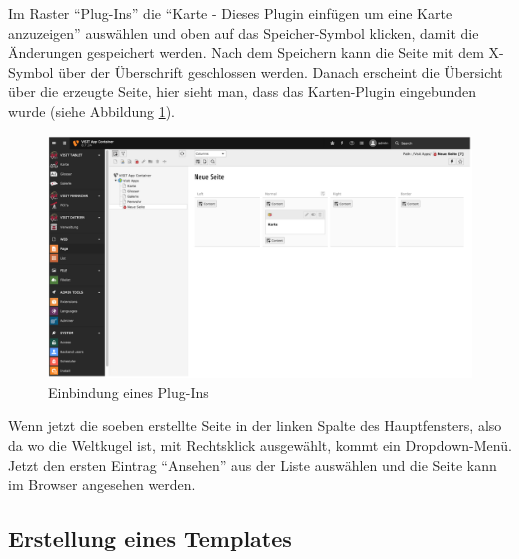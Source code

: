 Im Raster “Plug-Ins” die “Karte - Dieses Plugin einfügen um eine Karte anzuzeigen” auswählen und oben auf das Speicher-Symbol klicken, damit die Änderungen gespeichert werden. Nach dem Speichern kann die Seite mit dem X-Symbol über der Überschrift geschlossen werden. Danach erscheint die Übersicht über die erzeugte Seite, hier sieht man, dass das Karten-Plugin eingebunden wurde (siehe Abbildung \ref{img:einbindung_plugins}).

\begin{figure}[ht!]
\centering
\includegraphics[width=12cm]{Figures/paula/einbindung_plugin.png}
\caption{Einbindung eines Plug-Ins}
\label{img:einbindung_plugins}
\end{figure}

Wenn jetzt die soeben erstellte Seite in der linken Spalte des Hauptfensters, also da wo die Weltkugel ist, mit Rechtsklick ausgewählt, kommt ein Dropdown-Menü. Jetzt den ersten Eintrag “Ansehen” aus der Liste auswählen und die Seite kann im Browser angesehen werden.

\subsection{Erstellung eines Templates}

